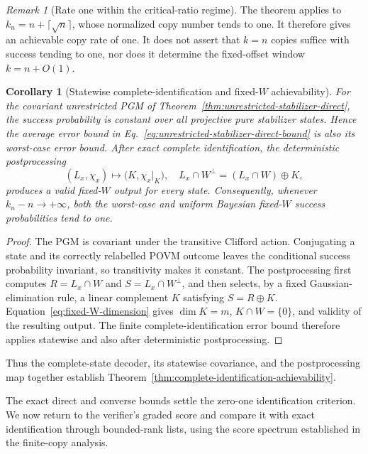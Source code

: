 \documentclass[11pt]{article}
\newcommand{\1}{\mathbf 1}
\theoremstyle{plain}
\newtheorem{corollary}[theorem]{Corollary}
\theoremstyle{definition}
\theoremstyle{remark}
\newtheorem{remark}[theorem]{Remark}
\begin{document}
\begin{remark}[Rate one within the critical-ratio regime]
\label{rem:unrestricted-rate-versus-pointwise}
The theorem applies to $k_n=n+\lceil\sqrt n\rceil$, whose normalized copy
number tends to one.  It therefore gives an achievable copy rate of one.
It does not assert that $k=n$ copies suffice with success tending to one, nor
does it determine the fixed-offset window $k=n+O(1)$.
\end{remark}

\begin{corollary}[Statewise complete-identification and fixed-$W$ achievability]
\label{cor:statewise-fixed-W-achievability}
For the covariant unrestricted PGM of
Theorem~\ref{thm:unrestricted-stabilizer-direct}, the success probability is
constant over all projective pure stabilizer states.  Hence the average error
bound in Eq.~\eqref{eq:unrestricted-stabilizer-direct-bound} is also its
worst-case error bound.  After exact complete identification, the deterministic
postprocessing
\begin{equation}
 (L_x,\chi_x)\longmapsto
 \bigl(K,\chi_x|_K\bigr),
 \quad
 L_x\cap W^\perp=(L_x\cap W)\oplus K,
 \label{eq:fixed-W-direct-postprocessing}
\end{equation}
produces a valid fixed-$W$ output for every state.  Consequently, whenever
$k_n-n\to+\infty$, both the worst-case and uniform Bayesian fixed-$W$ success
probabilities tend to one.
\end{corollary}
\begin{proof}
The PGM is covariant under the transitive Clifford action.  Conjugating a
state and its correctly relabelled POVM outcome leaves the conditional success
probability invariant, so transitivity makes it constant.  The postprocessing first computes $R=L_x\cap W$ and
$S=L_x\cap W^\perp$, and then selects, by a fixed Gaussian-elimination rule, a
linear complement $K$ satisfying $S=R\oplus K$.
Equation~\eqref{eq:fixed-W-dimension} gives $\dim K=m$,
$K\cap W=\{0\}$, and validity of the resulting output.  The finite
complete-identification error bound therefore applies statewise and also after
deterministic postprocessing.
\end{proof}

Thus the complete-state decoder, its statewise covariance, and the
postprocessing map together establish
Theorem~\ref{thm:complete-identification-achievability}.

The exact direct and converse bounds settle the zero-one identification
criterion.  We now return to the verifier's graded score and compare it with
exact identification through bounded-rank lists, using the score spectrum
established in the finite-copy analysis.
\end{document}
